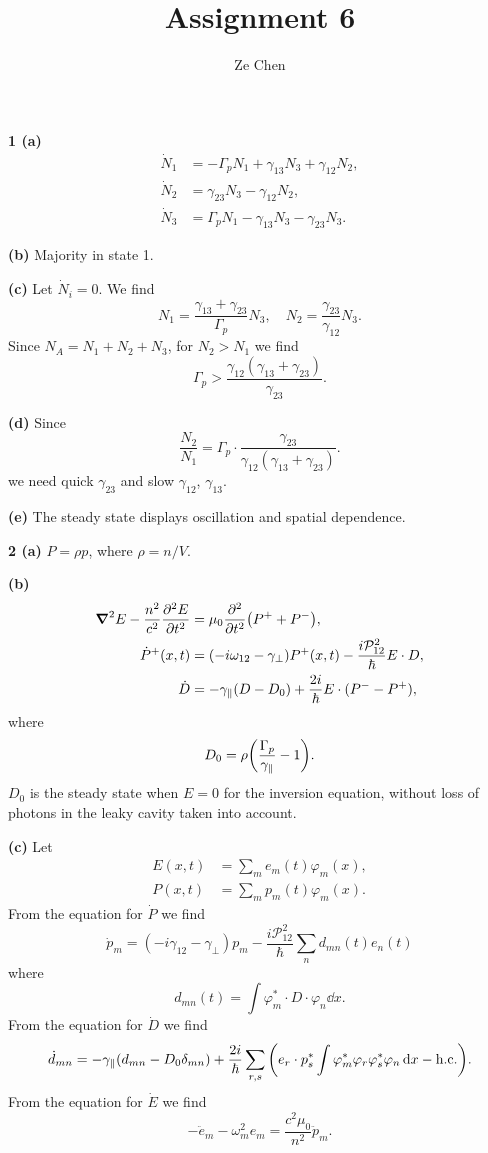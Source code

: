 \documentclass{article}
\title{Assignment 6}
\author{Ze Chen}
\makeatletter
\newcommand*{\shifttext}[1]{%
  \settowidth{\@tempdima}{#1}%
  \hspace{-\@tempdima}#1%
}
\newcommand{\plabel}[1]{%
\shifttext{\textbf{#1}\quad}%
}
\newcommand{\prule}{%
\begin{center}%
\hdashrule[0.5ex]{.99\linewidth}{1pt}{1pt 2.5pt}%
\end{center}%
}
\newcommand{\minusbaseline}{\abovedisplayskip=0pt\abovedisplayshortskip=0pt~\vspace*{-\baselineskip}}%
\makeatother
\begin{document}
\maketitle

\plabel{1 (a)}%
\begingroup\minusbaseline
\begin{align*}
    \dot{N}_1 &= -\Gamma_p N_1 + \gamma_{13}N_3 + \gamma_{12}N_2, \\
    \dot{N}_2 &= \gamma_{23}N_3 - \gamma_{12}N_2, \\
    \dot{N}_3 &= \Gamma_p N_1 - \gamma_{13}N_3 - \gamma_{23}N_3.
\end{align*}
\endgroup

\plabel{(b)}%
Majority in state 1.

\plabel{(c)}%
Let $\dot{N}_i = 0$.
We find
\[ N_1 = \frac{\gamma_{13}+\gamma_{23}}{\Gamma_p} N_3,\quad N_2 = \frac{\gamma_{23}}{\gamma_{12}} N_3. \]
Since $N_A = N_1 + N_2 + N_3$, for $N_2 > N_1$ we find
\[ \Gamma_p > \frac{\gamma_{12}(\gamma_{13}+\gamma_{23})}{\gamma_{23}}. \]

\plabel{(d)}%
Since
\[ \frac{N_2}{N_1} = \Gamma_p \cdot \frac{\gamma_{23}}{\gamma_{12}(\gamma_{13}+\gamma_{23})}. \]
we need quick $\gamma_{23}$ and slow $\gamma_{12}$, $\gamma_{13}$.

\plabel{(e)}%
The steady state displays oscillation and spatial dependence.

\prule

\plabel{2 (a)}%
$P = \rho p$, where $\rho = n/V$.

\plabel{(b)}%
\begingroup\minusbaseline
\begin{align*}
    \grad^2 E - \frac{n^2}{c^2} \pdv[2]{E}{t} &= \mu_0 \pdv[2]{}{t}\qty(P^+ + P^-), \\
    \dot{P}^+(x,t) &= (-i\omega_{12} - \gamma_\perp) P^+(x,t) - \frac{i\mathcal{P}_{12}^2}{\hbar} E \cdot D, \\
    \dot{D} &= -\gamma_{\parallel}(D - D_0) + \frac{2i}{\hbar}E\cdot (P^- - P^+),
\end{align*}
\endgroup
where
\[ D_0 = \rho\qty(\frac{\Gamma_p}{\gamma_{\parallel}} - 1). \]
$D_0$ is the steady state when $E=0$ for the inversion equation, without loss of photons in the leaky cavity taken into account.

\plabel{(c)}%
Let
\begin{align*}
    E(x,t) &= \sum_m e_m(t) \varphi_m(x), \\
    P(x,t) &= \sum_m p_m(t) \varphi_m(x).
\end{align*}
From the equation for $\dot{P}$ we find
\[ \dot{p}_m = (-i\gamma_{12} - \gamma_\perp) p_m - \frac{i\mathcal{P}^2_{12}}{\hbar} \sum_{n} d_{mn}(t) e_{n}(t) \]
where
\[ d_{mn}(t) = \int \varphi^*_m \cdot D \cdot \varphi_n \dd{x}. \]
From the equation for $\dot{D}$ we find
\[ \dot{d}_{mn} = -\gamma_\parallel(d_{mn} - D_0 \delta_{mn}) + \frac{2i}{\hbar}\sum_{r,s}\qty(e_r \cdot p^*_s \int \varphi^*_m \varphi_r \varphi_s^* \varphi_n \dd{x} - \text{h.c.}). \]
From the equation for $\dot{E}$ we find
\[ -\ddot{e}_m - \omega^2_m e_m = \frac{c^2\mu_0}{n^2} \ddot{p}_m. \]
\end{document}
